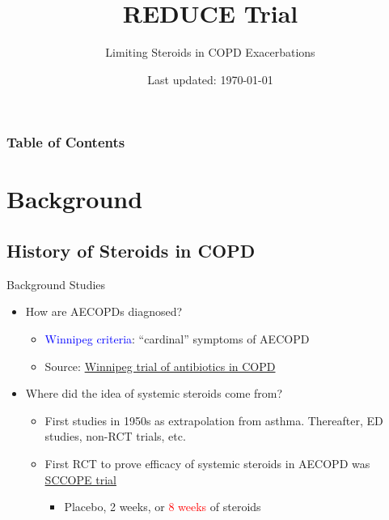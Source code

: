 \documentclass{beamer}
\title{REDUCE Trial}
\subtitle{Limiting Steroids in COPD Exacerbations}
\author{\me}
\date{Last updated: \today}
\newcommand{\pro}{\textcolor{blue}}
\newcommand{\con}{\textcolor{red}}
\newcommand{\sccope}{\href{https://doi.org/10.1016/S0197-2456(98)00011-7}{SCCOPE trial }}
\begin{document}
	\begin{frame}
		\maketitle
	\end{frame}
	\begin{frame}
		\frametitle{Table of Contents}
				\tableofcontents[hideallsubsections]
	\end{frame}
\section{Background}
	\subsection{History of Steroids in COPD}
		\begin{frame}{Background Studies}
			\begin{itemize}
				\item How are AECOPDs diagnosed?
				\pause
					\begin{itemize}
						\item \pro{Winnipeg criteria}:  ``cardinal'' symptoms of AECOPD
						\item Source: \href{https://doi.org/10.7326/0003-4819-106-2-196}{Winnipeg trial of antibiotics in COPD} \cite{anthonisen_antibiotic_1987}
					\end{itemize}
				\pause
				\item Where did the idea of systemic steroids come from?
				\pause
				\begin{itemize}
					\item First studies in 1950s as extrapolation from asthma. Thereafter, ED studies, non-RCT trials, etc. \cite{franklin_bronchodilators_1958,beerel_controlled_1963,evans_controlled_1974,albert_controlled_1980,mendella_steroid_1982,blair_treatment_1984}
					\item First RCT to prove efficacy of systemic steroids in AECOPD was \sccope  \cite{erbland_systemic_1998}
					\begin{itemize}
						\item Placebo, 2 weeks, or \con{8 weeks} of steroids
					\end{itemize}
				\end{itemize}
			\end{itemize}
		\end{frame}
\end{document}
